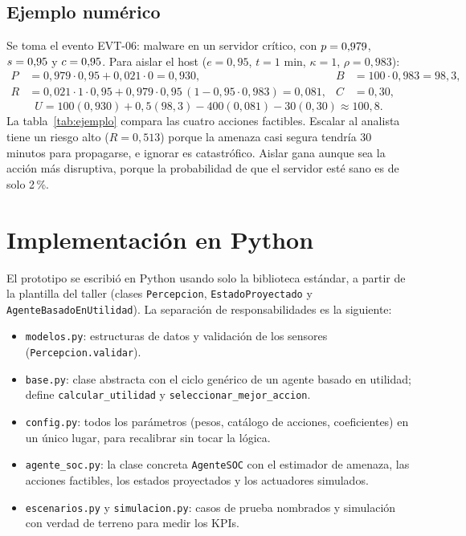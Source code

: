 \documentclass[11pt,a4paper]{article}
\begin{document}
\subsection{Ejemplo numérico}

Se toma el evento EVT-06: malware en un servidor crítico, con $p=0{,}979$, $s=0{,}95$ y $c=0{,}95$. Para aislar el host ($e=0{,}95$, $t=1$ min, $\kappa=1$, $\rho=0{,}983$):
\begin{align*}
P&=0{,}979\cdot0{,}95+0{,}021\cdot0=0{,}930, & B&=100\cdot0{,}983=98{,}3,\\
R&=0{,}021\cdot1\cdot0{,}95+0{,}979\cdot0{,}95\,(1-0{,}95\cdot0{,}983)=0{,}081, & C&=0{,}30,
\end{align*}
\[
U=100(0{,}930)+0{,}5(98{,}3)-400(0{,}081)-30(0{,}30)\approx 100{,}8.
\]
La tabla~\ref{tab:ejemplo} compara las cuatro acciones factibles. Escalar al analista tiene un riesgo alto ($R=0{,}513$) porque la amenaza casi segura tendría 30 minutos para propagarse, e ignorar es catastrófico. Aislar gana aunque sea la acción más disruptiva, porque la probabilidad de que el servidor esté sano es de solo 2\,\%.

\begin{table}[H]
\centering
\caption{Utilidad de cada acción factible en el evento EVT-06.}\label{tab:ejemplo}
\small

\end{table}

\section{Implementación en Python}\label{sec:impl}

El prototipo se escribió en Python usando solo la biblioteca estándar, a partir de la plantilla del taller (clases \texttt{Percepcion}, \texttt{EstadoProyectado} y \texttt{AgenteBasadoEnUtilidad}). La separación de responsabilidades es la siguiente:
\begin{itemize}
\item \texttt{modelos.py}: estructuras de datos y validación de los sensores (\texttt{Percepcion.validar}).
\item \texttt{base.py}: clase abstracta con el ciclo genérico de un agente basado en utilidad; define \texttt{calcular\_utilidad} y \texttt{seleccionar\_mejor\_accion}.
\item \texttt{config.py}: todos los parámetros (pesos, catálogo de acciones, coeficientes) en un único lugar, para recalibrar sin tocar la lógica.
\item \texttt{agente\_soc.py}: la clase concreta \texttt{AgenteSOC} con el estimador de amenaza, las acciones factibles, los estados proyectados y los actuadores simulados.
\item \texttt{escenarios.py} y \texttt{simulacion.py}: casos de prueba nombrados y simulación con verdad de terreno para medir los KPIs.
\end{itemize}
\end{document}
